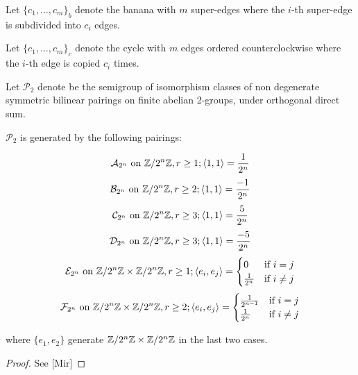 \documentclass{amsart}
\begin{document}
 \begin{defn} Let $\{c_{1}, \dots, c_{m}\}_{b}$ denote the banana with
$m$ super-edges where the $i$-th super-edge is subdivided into $c_{i}$
edges.
 \end{defn}
 
 \begin{defn} Let $\{c_{1}, \dots, c_{m}\}_{c}$ denote the cycle with
$m$ edges ordered counterclockwise where the $i$-th edge is copied
$c_{i}$ times.
 \end{defn}

 \begin{defn} Let $\mathcal{P}_{2}$ denote be the semigroup of
isomorphism classes of non degenerate symmetric bilinear pairings on
finite abelian 2-groups, under orthogonal direct sum.
 \end{defn}

 \begin{prop} $\mathcal{P}_{2}$ is generated by the following
pairings:
  
   \[ \mathcal{A}_{2^{n}} \text{ on } \mathbb{Z}/2^{n}\mathbb{Z}, r\ge 1; \langle 1,
1\rangle=\frac{1}{2^{n}}
   \]
   \[ \mathcal{B}_{2^{n}} \text{ on } \mathbb{Z}/2^{n}\mathbb{Z}, r\ge 2; \langle 1,
1\rangle=\frac{-1}{2^{n}}
   \]
   \[ \mathcal{C}_{2^{n}} \text{ on } \mathbb{Z}/2^{n}\mathbb{Z}, r\ge 3; \langle 1,
1\rangle=\frac{5}{2^{n}}
   \]
   \[ \mathcal{D}_{2^{n}} \text{ on } \mathbb{Z}/2^{n}\mathbb{Z}, r\ge 3; \langle 1,
1\rangle=\frac{-5}{2^{n}}
   \]
   \[ \mathcal{E}_{2^{n}} \text{ on } \mathbb{Z}/2^{n}\mathbb{Z}\times\mathbb{Z}/2^{n}\mathbb{Z}, r\ge 1; \langle
e_{i}, e_{j}\rangle=\begin{cases}0&\mbox{if } i=j\\
\frac{1}{2^{n}}&\mbox{if } i\neq j\end{cases}
   \]
   \[ \mathcal{F}_{2^{n}} \text{ on } \mathbb{Z}/2^{n}\mathbb{Z}\times\mathbb{Z}/2^{n}\mathbb{Z}, r\ge 2; \langle
e_{i}, e_{j}\rangle=\begin{cases}\frac{1}{2^{n-1}}&\mbox{if } i=j\\
\frac{1}{2^{n}}&\mbox{if } i\neq j\end{cases}
   \]
   
where $\{e_{1}, e_{2}\}$ generate $\mathbb{Z}/2^{n}\mathbb{Z}\times\mathbb{Z}/2^{n}\mathbb{Z}$ in the
last two cases.
 \end{prop}
 \begin{proof} See [Mir]
 \end{proof}
 
\end{document}
